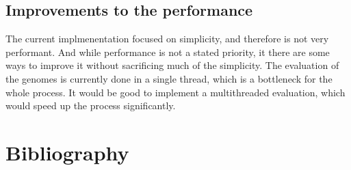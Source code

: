 \documentclass{article}
\begin{document}
        \subsection{Improvements to the performance}
        The current implmenentation focused on simplicity, and therefore is not very performant. And while performance
        is not a stated priority, it there are some ways to improve it without sacrificing much of the simplicity.
        The evaluation of the genomes is currently done in a single thread, which is a bottleneck for the whole process.
        It would be good to implement a multithreaded evaluation, which would speed up the process significantly.
\section{Bibliography}

\end{document}
